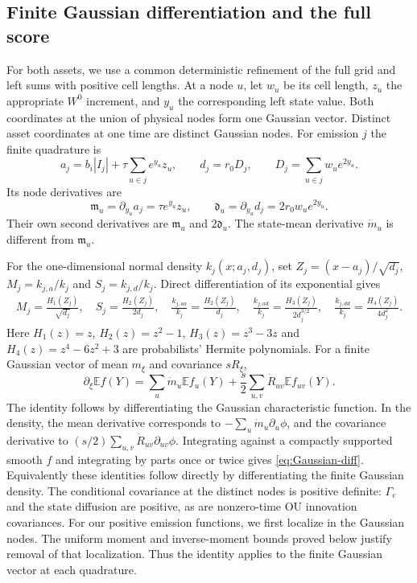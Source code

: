 \documentclass[11pt,a4paper]{amsart}
\theoremstyle{plain}
\theoremstyle{definition}
\theoremstyle{remark}
\newcommand{\EE}{\mathbb{E}}
\begin{document}
\subsection{Finite Gaussian differentiation and the full score}

For both assets, we use a common deterministic refinement of the full grid
and left sums with positive cell lengths. At a node $u$, let $w_u$ be its
cell length, $z_u$ the
appropriate $W^0$ increment, and $y_u$ the corresponding left state value.
Both coordinates at the union of physical nodes form one Gaussian vector.
Distinct asset coordinates at one time are distinct Gaussian nodes.
For emission $j$ the finite quadrature is
\begin{equation}\label{eq:quadrature}
 a_j=b_i|I_j|+\tau\sum_{u\in j}e^{y_u}z_u,
 \qquad d_j=r_0D_j,\qquad D_j=\sum_{u\in j}w_u e^{2y_u}.
\end{equation}
Its node derivatives are
\[
 \mathfrak m_u=\partial_{y_u}a_j=\tau e^{y_u}z_u,\qquad
 \mathfrak d_u=\partial_{y_u}d_j=2r_0w_u e^{2y_u}.
\]
Their own second derivatives are $\mathfrak m_u$ and $2\mathfrak d_u$.
The state-mean derivative $\dot m_u$ is different from $\mathfrak m_u$.

For the one-dimensional normal density $k_j(x;a_j,d_j)$, set
$Z_j=(x-a_j)/\sqrt{d_j}$, $M_j=k_{j,a}/k_j$ and $S_j=k_{j,d}/k_j$.
Direct differentiation of its exponential gives
\begin{equation}\label{eq:Hermite-identities}
 \begin{gathered}
 M_j=\frac{H_1(Z_j)}{\sqrt{d_j}},\quad
 S_j=\frac{H_2(Z_j)}{2d_j},\quad
 \frac{k_{j,aa}}{k_j}=\frac{H_2(Z_j)}{d_j},\quad
 \frac{k_{j,ad}}{k_j}=\frac{H_3(Z_j)}{2d_j^{3/2}},\quad
 \frac{k_{j,dd}}{k_j}=\frac{H_4(Z_j)}{4d_j^2}.
 \end{gathered}
\end{equation}
Here $H_1(z)=z$, $H_2(z)=z^2-1$, $H_3(z)=z^3-3z$ and
$H_4(z)=z^4-6z^2+3$ are probabilists' Hermite polynomials.
For a finite Gaussian vector of mean $m_\xi$ and covariance $sR_\xi$,
\begin{equation}\label{eq:Gaussian-diff}
 \partial_\xi\EE f(Y)
 =\sum_u\dot m_u\EE f_u(Y)
       +\frac{s}{2}\sum_{u,v}\dot R_{uv}\EE f_{uv}(Y).
\end{equation}
The identity follows by differentiating the Gaussian characteristic
function. In the density, the mean derivative corresponds to
$-\sum_u\dot m_u\partial_u\phi$, and the covariance derivative to
$(s/2)\sum_{u,v}\dot R_{uv}\partial_{uv}\phi$.
Integrating against a compactly supported smooth $f$ and integrating by
parts once or twice gives \eqref{eq:Gaussian-diff}. Equivalently these
identities follow directly by differentiating the finite Gaussian density.
The conditional covariance at the distinct nodes is positive definite:
$\Gamma_e$ and the state diffusion are positive, as are nonzero-time OU
innovation covariances. For our positive emission functions, we first
localize in the Gaussian nodes. The uniform moment and inverse-moment
bounds proved below justify removal of that localization. Thus the identity
applies to the finite Gaussian vector at each quadrature.
\end{document}
